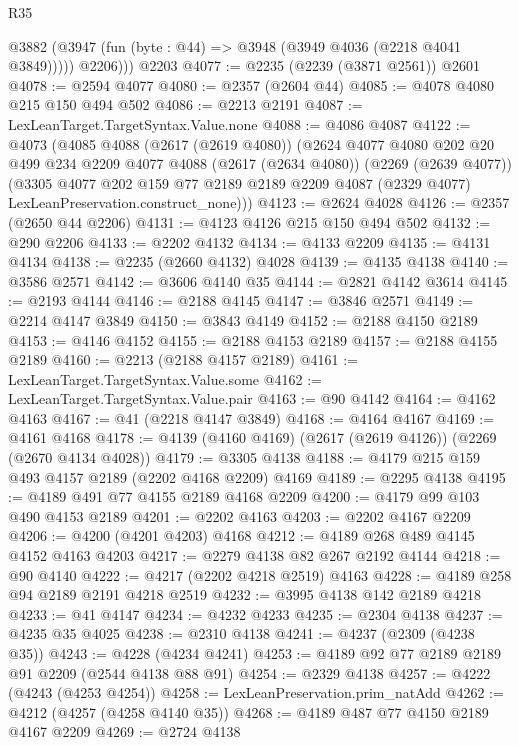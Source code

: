 \begin{lexlean}{R35}
\begin{coremodule}
        @3882 (@3947 (fun (byte : @44) => @3948 (@3949 @4036 (@2218 @4041 @3849)))))
          @2206)))
    @2203
@4077 := @2235 (@2239 (@3871 @2561)) @2601
@4078 := @2594 @4077
@4080 := @2357 (@2604 @44)
@4085 := @4078 @4080 @215 @150 @494 @502
@4086 := @2213 @2191
@4087 := LexLeanTarget.TargetSyntax.Value.none
@4088 := @4086 @4087
@4122 := @4073
    (@4085
      @4088
      (@2617 (@2619 @4080))
      (@2624
        @4077
        @4080
        @202
        @20
        @499
        @234
        @2209
        @4077
        @4088
        (@2617 (@2634 @4080))
        (@2269 (@2639 @4077))
        (@3305
          @4077
          @202
          @159
          @77
          @2189
          @2189
          @2209
          @4087
          (@2329 @4077)
          LexLeanPreservation.construct_none)))
@4123 := @2624 @4028
@4126 := @2357 (@2650 @44 @2206)
@4131 := @4123 @4126 @215 @150 @494 @502
@4132 := @290 @2206
@4133 := @2202 @4132
@4134 := @4133 @2209
@4135 := @4131 @4134
@4138 := @2235 (@2660 @4132) @4028
@4139 := @4135 @4138
@4140 := @3586 @2571
@4142 := @3606 @4140 @35
@4144 := @2821 @4142 @3614
@4145 := @2193 @4144
@4146 := @2188 @4145
@4147 := @3846 @2571
@4149 := @2214 @4147 @3849
@4150 := @3843 @4149
@4152 := @2188 @4150 @2189
@4153 := @4146 @4152
@4155 := @2188 @4153 @2189
@4157 := @2188 @4155 @2189
@4160 := @2213 (@2188 @4157 @2189)
@4161 := LexLeanTarget.TargetSyntax.Value.some
@4162 := LexLeanTarget.TargetSyntax.Value.pair
@4163 := @90 @4142
@4164 := @4162 @4163
@4167 := @41 (@2218 @4147 @3849)
@4168 := @4164 @4167
@4169 := @4161 @4168
@4178 := @4139 (@4160 @4169) (@2617 (@2619 @4126)) (@2269 (@2670 @4134 @4028))
@4179 := @3305 @4138
@4188 := @4179 @215 @159 @493 @4157 @2189 (@2202 @4168 @2209) @4169
@4189 := @2295 @4138
@4195 := @4189 @491 @77 @4155 @2189 @4168 @2209
@4200 := @4179 @99 @103 @490 @4153 @2189
@4201 := @2202 @4163
@4203 := @2202 @4167 @2209
@4206 := @4200 (@4201 @4203) @4168
@4212 := @4189 @268 @489 @4145 @4152 @4163 @4203
@4217 := @2279 @4138 @82 @267 @2192 @4144
@4218 := @90 @4140
@4222 := @4217 (@2202 @4218 @2519) @4163
@4228 := @4189 @258 @94 @2189 @2191 @4218 @2519
@4232 := @3995 @4138 @142 @2189 @4218
@4233 := @41 @4147
@4234 := @4232 @4233
@4235 := @2304 @4138
@4237 := @4235 @35 @4025
@4238 := @2310 @4138
@4241 := @4237 (@2309 (@4238 @35))
@4243 := @4228 (@4234 @4241)
@4253 := @4189 @92 @77 @2189 @2189 @91 @2209 (@2544 @4138 @88 @91)
@4254 := @2329 @4138
@4257 := @4222 (@4243 (@4253 @4254))
@4258 := LexLeanPreservation.prim_natAdd
@4262 := @4212 (@4257 (@4258 @4140 @35))
@4268 := @4189 @487 @77 @4150 @2189 @4167 @2209
@4269 := @2724 @4138

\end{coremodule}
\end{lexlean}
